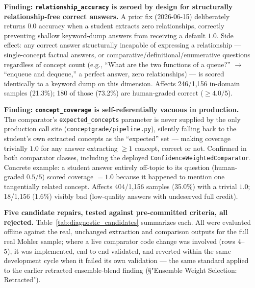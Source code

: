 \documentclass[conference]{IEEEtran}
\begin{document}
\textbf{Finding: \texttt{relationship\_accuracy} is zeroed by design for
structurally relationship-free correct answers.} A prior fix (2026-06-15)
deliberately returns $0.0$ accuracy when a student extracts zero
relationships, correctly preventing shallow keyword-dump answers from
receiving a default $1.0$. Side effect: any correct answer structurally
incapable of expressing a relationship — single-concept factual answers,
or comparative/definitional/enumerative questions regardless of concept
count (e.g., ``What are the two functions of a queue?'' $\to$ ``enqueue
and dequeue,'' a perfect answer, zero relationships) — is scored
identically to a keyword dump on this dimension. Affects 246/1{,}156
in-domain samples (21.3\%); 180 of those (73.2\%) are human-graded
correct ($\geq 4.0/5$).

\textbf{Finding: \texttt{concept\_coverage} is self-referentially
vacuous in production.} The comparator's \texttt{expected\_concepts}
parameter is never supplied by the only production call site
(\texttt{conceptgrade/pipeline.py}), silently falling back to the
student's own extracted concepts as the ``expected'' set — making
coverage trivially $1.0$ for any answer extracting $\geq 1$ concept,
correct or not. Confirmed in both comparator classes, including the
deployed \texttt{ConfidenceWeightedComparator}. Concrete example: a
student answer entirely off-topic to its question (human-graded $0.5/5$)
scored coverage $=1.0$ because it happened to mention one tangentially
related concept. Affects 404/1{,}156 samples (35.0\%) with a trivial
$1.0$; 18/1{,}156 (1.6\%) visibly bad (low-quality answers with undeserved
full credit).

\textbf{Five candidate repairs, tested against pre-committed criteria,
all rejected.} Table~\ref{tab:diagnostic_candidates} summarizes each. All
were evaluated offline against the real, unchanged extraction and
comparison outputs for the full real Mohler sample; where a live
comparator code change was involved (rows 4--5), it was implemented,
end-to-end validated, and reverted within the same development cycle when
it failed its own validation — the same standard applied to the earlier
retracted ensemble-blend finding (\S"Ensemble Weight Selection:
Retracted").
\end{document}

